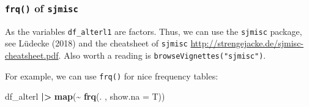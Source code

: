 \documentclass[
  doc]{apa6}
\newenvironment{Shaded}{\begin{snugshade}}{\end{snugshade}}
\newcommand{\AttributeTok}[1]{\textcolor[rgb]{0.13,0.29,0.53}{#1}}
\newcommand{\FunctionTok}[1]{\textcolor[rgb]{0.13,0.29,0.53}{\textbf{#1}}}
\newcommand{\NormalTok}[1]{#1}
\newcommand{\SpecialCharTok}[1]{\textcolor[rgb]{0.81,0.36,0.00}{\textbf{#1}}}
\begin{document}
\hypertarget{frq-of-sjmisc}{%
\subsubsection{\texorpdfstring{\texttt{frq()} of \texttt{sjmisc}}{frq() of sjmisc}}\label{frq-of-sjmisc}}

As the variables \texttt{df\_alterl1} are factors. Thus, we can use the \texttt{sjmisc} package, see Lüdecke (2018) and the cheatsheet of \texttt{sjmisc} \url{http://strengejacke.de/sjmisc-cheatsheet.pdf}. Also worth a reading is \texttt{browseVignettes("sjmisc")}.

For example, we can use \texttt{frq()} for nice frequency tables:

\begin{Shaded}
\begin{Highlighting}[]
\NormalTok{df\_alterl }\SpecialCharTok{|\textgreater{}} 
  \FunctionTok{map}\NormalTok{(}\SpecialCharTok{\textasciitilde{}} \FunctionTok{frq}\NormalTok{(. , }\AttributeTok{show.na =}\NormalTok{ T))}
\end{Highlighting}
\end{Shaded}
\end{document}
